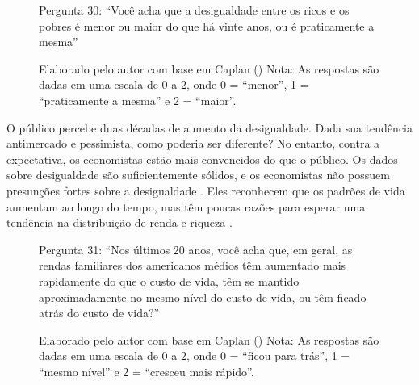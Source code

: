 \begin{figure}[H]
    \centering
    \caption*{Pergunta 30: “Você acha que a desigualdade entre os ricos e os pobres é menor ou maior do que há vinte anos, ou é praticamente a mesma”}
    \caption{Elaborado pelo autor com base em Caplan (\citeyear{The_Myth_of_the_Rational_Voter}) \newline
    Nota: As respostas são dadas em uma escala de 0 a 2, onde 0 = “menor”, 1 = “praticamente a mesma” e 2 = “maior”.}
    \label{fig:pergunta_30}
\end{figure}

O público percebe duas décadas de aumento da desigualdade. Dada sua tendência antimercado e pessimista, como poderia ser diferente? No entanto, contra a expectativa, os economistas estão mais convencidos do que o público. Os dados sobre desigualdade são suficientemente sólidos, e os economistas não possuem presunções fortes sobre a desigualdade \cite{Gottschalk-Peter}. Eles reconhecem que os padrões de vida aumentam ao longo do tempo, mas têm poucas razões para esperar uma tendência na distribuição de renda e riqueza \cite{The_Myth_of_the_Rational_Voter}.


\begin{figure}[H]
    \centering
    \caption*{Pergunta 31: “Nos últimos 20 anos, você acha que, em geral, as rendas familiares dos americanos médios têm aumentado mais rapidamente do que o custo de vida, têm se mantido aproximadamente no mesmo nível do custo de vida, ou têm ficado atrás do custo de vida?”}
    \caption{Elaborado pelo autor com base em Caplan (\citeyear{The_Myth_of_the_Rational_Voter}) \newline
    Nota: As respostas são dadas em uma escala de 0 a 2, onde 0 = “ficou para trás”, 1 = “mesmo nível” e 2 = “cresceu mais rápido”.}
    \label{fig:pergunta_31}
\end{figure}

